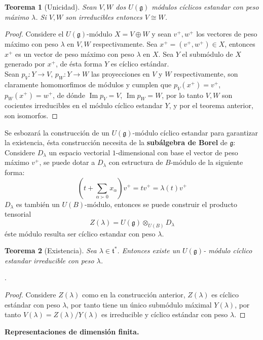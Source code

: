 \documentclass[11pt,a4paper]{article}
\newtheorem{theorem}{Teorema}
\newcommand{\Ima}{\operatorname{Im}}
\newcommand{\mfg}{\mathfrak{g}}
\begin{document}
\begin{theorem}[Unicidad] Sean $V,W$ dos $U(\mfg)$ módulos cíclicos estandar  con peso máximo $\lambda$. Si $V,W$ son irreducibles entonces $V\cong W$.
\end{theorem}
\begin{proof}
Considere el $U(\mfg)$-módulo $X=V\oplus W$ y sean $v^+, w^+$ los vectores de peso máximo con peso $\lambda$ en $V,W$ respectivamente. Sea $x^+=(v^+, w^+) \in X$, entonces $x^+$ es un vector de peso máximo con peso $\lambda$ en $X$. Sea $Y$ el submódulo de $X$ generado por $x^+$, de ésta forma $Y$ es cíclico estándar. \\
Sean $p_V: Y\rightarrow V$, $p_W: Y \rightarrow W$  las proyecciones en $V$ y $W$ respectivamente, son claramente homomorfimos de módulos y cumplen que $p_V(x^+)=v^+$, $p_W (x^+)= w^+$, de dónde $\Ima p_V= V$, $\Ima p_W=W$, por lo tanto $V,W$ son cocientes irreducibles en el módulo cíclico estandar $Y$, y por el teorema anterior, son isomorfos. 
\end{proof}
Se esbozará la construcción de un $U(\mfg)$-módulo cíclico estandar para garantizar la existencia, ésta construcción necesita de la \textbf{subálgebra de Borel} de $\mfg$: \\
Considere $D_{\lambda}$ un espacio vectorial $1$-dimensional con base el vector de peso máximo $v^+$, se puede dotar a $D_\lambda$ con estructura de $B$-módulo de la siguiente forma:
$$(t + \sum_{\alpha\succ 0}x_\alpha) v^+ = tv^+= \lambda(t)v^+ $$
$D_{\lambda}$ es también un $U(B)$-módulo, entonces se puede construir el producto tensorial $$Z(\lambda)= U(\mfg) \otimes_{U(B)} D_\lambda$$
éste módulo resulta ser cíclico estandar con peso $\lambda$.

\begin{theorem}[Existencia]
Sea $\lambda \in \mathfrak{t}^*$. Entonces existe un $U(\mfg)$- módulo cíclico estandar irreducible con peso $\lambda$.
\end{theorem}.
\begin{proof}
Considere $Z(\lambda)$ como en la construcción anterior, $Z(\lambda)$ es cíclico estándar con peso $\lambda$, por tanto tiene un único submódulo máximal $Y(\lambda)$, por tanto $V(\lambda)= Z(\lambda) / Y(\lambda)$ es irreducible y cíclico estándar con peso $\lambda$.
\end{proof}
\textbf{Representaciones de dimensión finita.}\\
\end{document}
